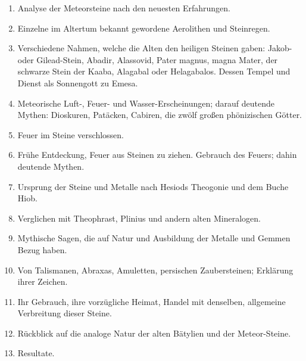\documentclass[a4paper, 11pt, oneside, polutonikogreek, german]{article}
\begin{document}
\begin{enumerate}
\begin{enumerate}
        \item Analyse der Meteorsteine nach den neuesten Erfahrungen.
        \item Einzelne im Altertum bekannt gewordene Aerolithen und Steinregen.
        \item Verschiedene Nahmen, welche die Alten den heiligen Steinen gaben: Jakob- oder Gilead-Stein, Abadir, Alassovid, Pater magnus, magna Mater, der schwarze Stein der Kaaba, Alagabal oder Helagabalos. Dessen Tempel und Dienst als Sonnengott zu Emesa.
        \item Meteorische Luft-, Feuer- und Wasser-Erscheinungen; darauf deutende Mythen: Dioskuren, Patäcken, Cabiren, die zwölf großen phönizischen Götter.
        \item Feuer im Steine verschlossen.
        \item Frühe Entdeckung, Feuer aus Steinen zu ziehen. Gebrauch des Feuers; dahin deutende Mythen.
        \item Ursprung der Steine und Metalle nach Hesiods Theogonie und dem Buche Hiob.
        \item Verglichen mit Theophrast, Plinius und andern alten Mineralogen.
        \item Mythische Sagen, die auf Natur und Ausbildung der Metalle und Gemmen Bezug haben.
        \item Von Talismanen, Abraxas, Amuletten, persischen Zaubersteinen; Erklärung ihrer Zeichen.
        \item Ihr Gebrauch, ihre vorzügliche Heimat, Handel mit denselben, allgemeine Verbreitung dieser Steine.
        \item Rückblick auf die analoge Natur der alten Bätylien und der Meteor-Steine.
        \item Resultate.
    \end{enumerate}
\end{enumerate}
\clearpage
\end{document}
